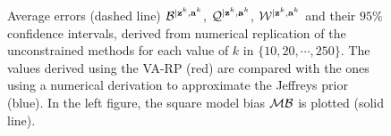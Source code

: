 \begin{figure}[h]
    \centering
    \caption{Average errors (dashed line) $\mathcal{B}^{|\mathbf{z}^k,\mathbf{a}^k}$, $\mathcal{Q}^{|\mathbf{z}^k,\mathbf{a}^k}$, $\mathcal{W}^{|\mathbf{z}^k,\mathbf{a}^k}$ and their $95\%$ confidence intervals, derived from numerical replication of the unconstrained methods for each value of $k$ in $\{10,20,\cdots,250\}$. The values derived 
    using the VA-RP (red) are compared with the ones 
    using a numerical derivation to approximate the Jeffreys prior (blue). In the left figure, the square model bias $\mathcal{M}\mathcal{B}$ is plotted (solid line).}
    \label{fig:errors-unconstrained}
\end{figure}




